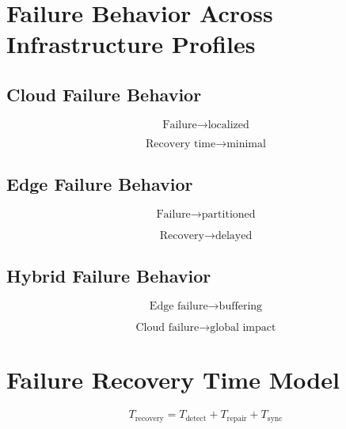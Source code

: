 \section{Failure Behavior Across Infrastructure Profiles}

\subsection{Cloud Failure Behavior}

\begin{equation}
\text{Failure} \rightarrow \text{localized}
\end{equation}

\begin{equation}
\text{Recovery time} \rightarrow \text{minimal}
\end{equation}

\subsection{Edge Failure Behavior}

\begin{equation}
\text{Failure} \rightarrow \text{partitioned}
\end{equation}

\begin{equation}
\text{Recovery} \rightarrow \text{delayed}
\end{equation}

\subsection{Hybrid Failure Behavior}

\begin{equation}
\text{Edge failure} \rightarrow \text{buffering}
\end{equation}

\begin{equation}
\text{Cloud failure} \rightarrow \text{global impact}
\end{equation}

\section{Failure Recovery Time Model}

\begin{equation}
T_{\text{recovery}} = T_{\text{detect}} + T_{\text{repair}} + T_{\text{sync}}
\end{equation}

